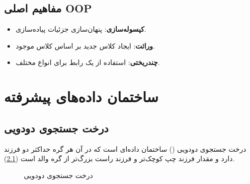 \documentclass{matinbook}
\begin{document}
\section{مفاهیم اصلی OOP}
\label{sec:oop-concepts}

\begin{itemize}
    \item \textbf{کپسوله‌سازی}:
    پنهان‌سازی جزئیات پیاده‌سازی.
    \item \textbf{وراثت}: ایجاد کلاس
    جدید بر اساس کلاس موجود.
    \item \textbf{چندریختی}: استفاده
    از یک رابط برای انواع مختلف.
\end{itemize}

\chapter{ساختمان داده‌های پیشرفته}
\label{chap:data-structures}

\section{درخت جستجوی دودویی}
\label{sec:ds-bst}

درخت جستجوی دودویی
() ساختمان داده‌ای است که در آن هر گره
حداکثر دو فرزند دارد و مقدار فرزند چپ کوچک‌تر و
فرزند راست بزرگ‌تر از گره والد است
(\cref{fig:bst}).

\begin{figure}[h]
\centering
\begin{latin}
\end{latin}
\caption{درخت جستجوی دودویی}
\label{fig:bst}
\end{figure}
\end{document}
